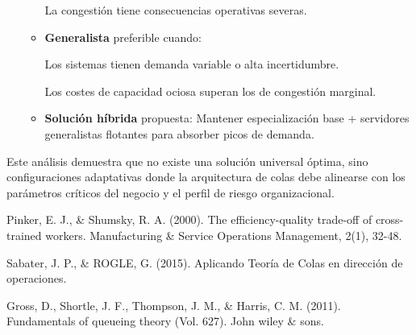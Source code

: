 \documentclass[letterpaper, 12pt]{report}
\begin{document}
\begin{itemize}
\begin{itemize}
    La congesti\'on tiene consecuencias operativas severas. 
    
\item \textbf{Generalista} preferible cuando:

   Los sistemas tienen demanda variable o alta incertidumbre.
   
    Los costes de capacidad ociosa superan los de congestión marginal.    
    
    \item \textbf{Solución híbrida} propuesta: Mantener especialización base + servidores generalistas flotantes para absorber picos de demanda.
    \end{itemize}
    \end{itemize}



Este análisis demuestra que no existe una solución universal óptima, sino configuraciones adaptativas donde la arquitectura de colas debe alinearse con los parámetros críticos del negocio y el perfil de riesgo organizacional.

\begin{thebibliography}{9}

     Pinker, E. J., \& Shumsky, R. A. (2000). The efficiency-quality trade-off of cross-trained workers. Manufacturing \& Service Operations Management, 2(1), 32-48.

     Sabater, J. P., \& ROGLE, G. (2015). Aplicando Teoría de Colas en dirección de operaciones.
    
    Gross, D., Shortle, J. F., Thompson, J. M., \& Harris, C. M. (2011). Fundamentals of queueing theory (Vol. 627). John wiley \& sons.

%    
 
\end{thebibliography}
\end{document}
